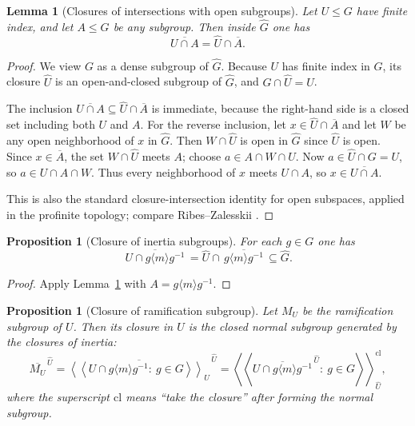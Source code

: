 \documentclass[11pt]{article}
\newtheorem{proposition}[theorem]{Proposition}
\newtheorem{lemma}[theorem]{Lemma}
\begin{document}
	
	\begin{lemma}[Closures of intersections with open subgroups]\label{lem:closure-intersection}
		Let $U\le G$ have finite index, and let $A\le G$ be any subgroup. Then inside $\widehat G$ one has
		\[ \overline{U\cap A} = \widehat U\cap \overline{A}.\]
	\end{lemma}
	
	\begin{proof}
		We view $G$ as a dense subgroup of $\widehat G$. Because $U$ has finite index in $G$, its closure $\widehat U$ is an open-and-closed subgroup of $\widehat G$, and $G\cap\widehat U=U$.
		
		The inclusion $\overline{U\cap A}\subseteq\widehat U\cap\overline A$ is immediate, because the right-hand side is a closed set including both $U$ and $A$. For the reverse inclusion, let $x\in\widehat U\cap\overline A$ and let $W$ be any open neighborhood of $x$ in $\widehat G$. Then $W\cap\widehat U$ is open in $\widehat G$ since $\widehat U$ is open. Since $x\in\overline A$, the set $W\cap\widehat U$ meets $A$; choose $a\in A\cap W\cap\widehat U$. Now $a\in \widehat U\cap G=U$, so $a\in U\cap A\cap W$. Thus every neighborhood of $x$ meets $U\cap A$, so $x\in\overline{U\cap A}$.
		
		This is also the standard closure-intersection identity for open subspaces, applied in the profinite topology; compare Ribes--Zalesskii \cite{RibesZalesskii}.
	\end{proof}
	
	\begin{proposition}[Closure of inertia subgroups]\label{thm:closure-inertia}
		For each $g\in G$ one has
		\[ \overline{\,U\cap g\langle m\rangle g^{-1}\,} = \widehat U \cap \overline{\,g\langle m\rangle g^{-1}\,} \subseteq \widehat G.\]
	\end{proposition}
	
	\begin{proof}
		Apply Lemma~\ref{lem:closure-intersection} with $A=g\langle m\rangle g^{-1}$.
	\end{proof}
	
	\begin{proposition}[Closure of ramification subgroup]\label{thm:closure-ramification}
		Let $M_U$ be the ramification subgroup of $U$. Then its closure in $\widehat U$ is the \emph{closed normal subgroup} generated by the closures of inertia:
		\[ \overline{M_U}^{\,\widehat U} = \overline{\left\langle\!\left\langle U\cap g\langle m\rangle g^{-1}:\ g\in G \right\rangle\!\right\rangle_U}^{\,\widehat U}
		=\left\langle\!\left\langle \overline{U\cap g\langle m\rangle g^{-1}}^{\,\widehat U}:\ g\in G \right\rangle\!\right\rangle_{\widehat U}^{\mathrm{cl}},\]
		where the superscript $\mathrm{cl}$ means ``take the closure'' after forming the normal subgroup.
	\end{proposition}
	
\end{document}
